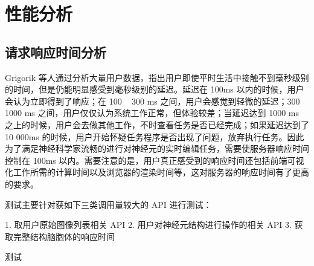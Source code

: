 \chapter{性能分析}

\section{请求响应时间分析}
Grigorik 等人通过分析大量用户数据，指出用户即使平时生活中接触不到毫秒级别的时间，但是仍能明显感受到毫秒级别的延迟。延迟在 100ms 以内的时候，用户会认为立即得到了响应；在 100 ~ 300 ms 之间，用户会感觉到轻微的延迟；300 ~ 1000 ms 之间，用户仅仅认为系统工作正常，但体验较差；当延迟达到 1000 ms 之上的时候，用户会去做其他工作，不时查看任务是否已经完成；如果延迟达到了 10 000ms 的时候，用户开始怀疑任务程序是否出现了问题，放弃执行任务。因此为了满足神经科学家流畅的进行对神经元的实时编辑任务，需要使服务器响应时间控制在 100ms 以内。需要注意的是，用户真正感受到的响应时间还包括前端可视化工作所需的计算时间以及浏览器的渲染时间等，这对服务器的响应时间有了更高的要求。

测试主要针对获如下三类调用量较大的 API 进行测试：

1. 取用户原始图像列表相关 API
2. 用户对神经元结构进行操作的相关 API
3. 获取完整结构脑胞体的响应时间

测试

